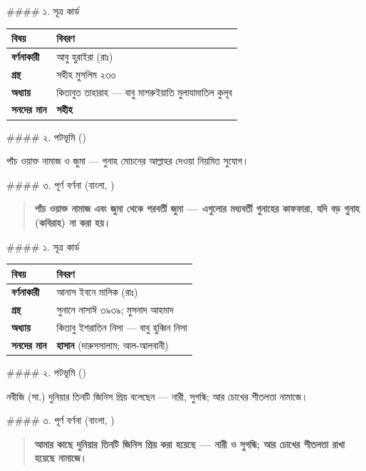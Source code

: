 \#\#\#\# ১. সূত্র কার্ড

\begin{table}[h]\centering\small
\begin{tabular}{ll}
বিষয় & বিবরণ \\
\hline
\textbf{বর্ণনাকারী} & আবু হুরাইরা (রাঃ) \\
\textbf{গ্রন্থ} & সহীহ মুসলিম ২৩৩ \\
\textbf{অধ্যায়} & কিতাবুত তাহারাহ — বাবু মাশরুইয়াতি মুলাযামাতিল কুলূব \\
\textbf{সনদের মান} & \textbf{সহীহ} \\
\hline
\end{tabular}
\end{table}

\#\#\#\# ২. পটভূমি ()

পাঁচ ওয়াক্ত নামাজ ও জুমা — গুনাহ মোচনের আল্লাহর দেওয়া নিয়মিত সুযোগ।

\#\#\#\# ৩. পূর্ণ বর্ণনা (বাংলা, )

\begin{quote}
\textbf{পাঁচ ওয়াক্ত নামাজ এবং জুমা থেকে পরবর্তী জুমা — এগুলোর মধ্যবর্তী গুনাহের কাফফারা, যদি বড় গুনাহ (কবিরাহ) না করা হয়।}
\end{quote}

\#\#\#\# ১. সূত্র কার্ড

\begin{table}[h]\centering\small
\begin{tabular}{ll}
বিষয় & বিবরণ \\
\hline
\textbf{বর্ণনাকারী} & আনাস ইবনে মালিক (রাঃ) \\
\textbf{গ্রন্থ} & সুনানে নাসাঈ ৩৯৩৯; মুসনাদ আহমাদ \\
\textbf{অধ্যায়} & কিতাবু ইশরাতিন নিসা — বাবু হুব্বিন নিসা \\
\textbf{সনদের মান} & \textbf{হাসান} (দারুসসালাম; আল-আলবানী) \\
\hline
\end{tabular}
\end{table}

\#\#\#\# ২. পটভূমি ()

নবীজি (সা.) দুনিয়ার তিনটি জিনিস প্রিয় বলেছেন — নারী, সুগন্ধি; আর চোখের শীতলতা নামাজে।

\#\#\#\# ৩. পূর্ণ বর্ণনা (বাংলা, )

\begin{quote}
\textbf{আমার কাছে দুনিয়ার তিনটি জিনিস প্রিয় করা হয়েছে — নারী ও সুগন্ধি; আর চোখের শীতলতা রাখা হয়েছে নামাজে।}
\end{quote}

